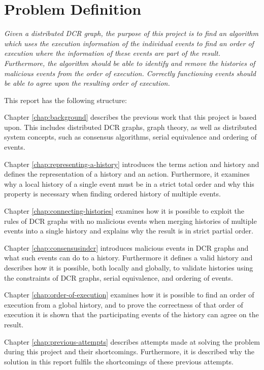 \section{Problem Definition}
	\textit{Given a distributed DCR graph, the purpose of this project is to find an algorithm which uses the execution information of the individual events to find an order of execution where the information of these events are part of the result. Furthermore, the algorithm should be able to identify and remove the histories of malicious events from the order of execution. Correctly functioning events should be able to agree upon the resulting order of execution.}
	
	\vspace{0.4cm}
	
	\newpar
	This report has the following structure:
	
	\newpar
	Chapter \ref{chap:background} describes the previous work that this project is based upon. This includes distributed DCR graphs, graph theory, as well as distributed system concepts, such as consensus algorithms, serial equivalence and ordering of events.
		
	\newpar
	Chapter \ref{chap:representing-a-history} introduces the terms action and history and defines the representation of a history and an action.
	Furthermore, it examines why a local history of a single event must be in a strict total order and why this property is necessary when finding ordered history of multiple events. 
		
	\newpar
	Chapter \ref{chap:connecting-histories} examines how it is possible to exploit the rules of DCR graphs with no malicious events when merging histories of multiple events into a single history and explains why the result is in strict partial order.
	
	\newpar
	Chapter \ref{chap:consensusindcr} introduces malicious events in DCR graphs and what such events can do to a history. Furthermore it defines a valid history and describes how it is possible, both locally and globally, to validate histories using the constraints of DCR graphs, serial equivalence, and ordering of events.
	
    \newpar
    Chapter \ref{chap:order-of-execution} examines how it is possible to find an order of execution from a global history, and to prove the correctness of that order of execution it is shown that the participating events of the history can agree on the result.
    
	\newpar
	Chapter \ref{chap:previous-attempts} describes attempts made at solving the problem during this project and their shortcomings. Furthermore, it is described why the solution in this report fulfils the shortcomings of these previous attempts. 
		
	